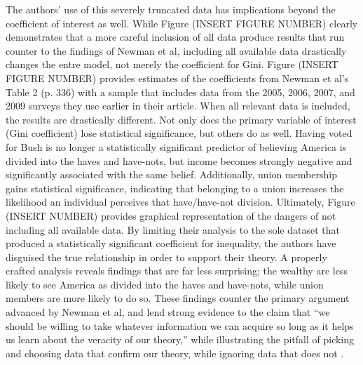 The authors’ use of this severely truncated data has implications beyond the coefficient of interest as well. While Figure (INSERT FIGURE NUMBER) clearly demonstrates that a more careful inclusion of all data produce results that run counter to the findings of Newman et al, including all available data drastically changes the entre model, not merely the coefficient for Gini. Figure (INSERT FIGURE NUMBER) provides estimates of the coefficients from Newman et al’s Table 2 (p. 336) with a sample that includes data from the 2005, 2006, 2007, and 2009 surveys they use earlier in their article. When all relevant data is included, the results are drastically different. Not only does the primary variable of interest (Gini coefficient) lose statistical significance, but others do as well. Having voted for Bush is no longer a statistically significant predictor of believing America is divided into the haves and have-nots, but income becomes strongly negative and significantly associated with the same belief. Additionally, union membership gains statistical significance, indicating that belonging to a union increases the likelihood an individual perceives that have/have-not division. Ultimately, Figure (INSERT NUMBER) provides graphical representation of the dangers of not including all available data. By limiting their analysis to the sole dataset that produced a statistically significant coefficient for inequality, the authors have disguised the true relationship in order to support their theory. A properly crafted analysis reveals findings that are far less surprising; the wealthy are less likely to see America as divided into the haves and have-nots, while union members are more likely to do so. These findings counter the primary argument advanced by Newman et al, and lend strong evidence to the claim that “we should be willing to take whatever information we can acquire so long as it helps us learn about the veracity of our theory,” while illustrating the pitfall of picking and choosing data that confirm our theory, while ignoring data that does not \citep{King1994 p.31}.


